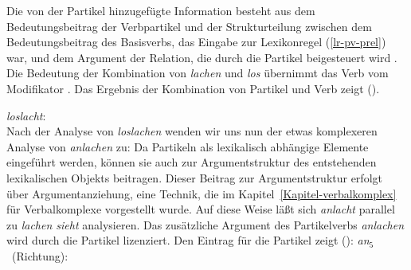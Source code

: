 \noindent
Die von der Partikel hinzugefügte Information besteht aus dem Bedeutungsbeitrag der Verbpartikel
und der Strukturteilung zwischen dem Bedeutungsbeitrag
des Basisverbs, das Eingabe zur Lexikonregel (\ref{lr-pv-prel}) war, und dem Argument der Relation,
die durch die Partikel beigesteuert wird . 
Die Bedeutung der Kombination von \emph{lachen} und \emph{los} übernimmt das Verb vom Modifikator
. 
Das Ergebnis der Kombination von Partikel und Verb zeigt ().

\eas
\label{le-loslacht}
\emph{loslacht}:\\
\zs
Nach der Analyse von \emph{loslachen} wenden wir uns nun der etwas komplexeren Analyse von
\emph{anlachen} zu: Da Partikeln als lexikalisch abhängige Elemente eingeführt werden, 
können sie auch zur Argumentstruktur des entstehenden lexikalischen Objekts
beitragen. Dieser Beitrag zur Argumentstruktur erfolgt über Argumentanziehung,
eine Technik, die im Kapitel~\ref{Kapitel-verbalkomplex} für Verbalkomplexe vorgestellt
wurde. Auf diese Weise läßt sich \emph{anlacht} parallel zu \emph{lachen sieht}
analysieren. Das zusätzliche Argument des Partikelverbs \emph{anlachen} wird durch
die Partikel lizenziert. Den Eintrag für die Partikel zeigt ():
\eas
\label{le-an5}
\mbox{\emph{an$_5$} (Richtung):}\\
\zs

